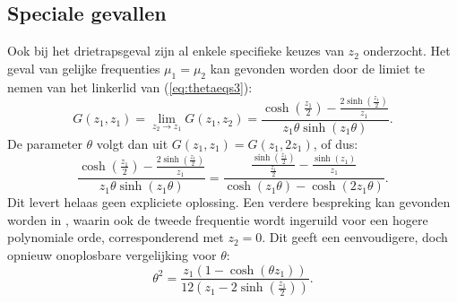 \documentclass[12pt]{article}
\begin{document}
\subsection{Speciale gevallen}
Ook bij het drietrapsgeval zijn al enkele specifieke keuzes van \(z_2\) onderzocht. Het geval van gelijke frequenties \(\mu_1=\mu_2\) kan gevonden worden door de limiet te nemen van het linkerlid van (\ref{eq:thetaeqs3}):
\[G(z_1,z_1)=\lim_{z_2\to z_1}G(z_1,z_2)=\frac{\cosh(\frac{z_1}{2})-\frac{2\sinh(\frac{z_1}{2})}{z_1}}{z_1\theta\sinh(z_1\theta)}.\]
De parameter \(\theta\) volgt dan uit \(G(z_1,z_1)=G(z_1,2z_1)\), of dus:
\begin{equation} \label{eq:rks3z2=z1}
    \frac{\cosh(\frac{z_1}{2})-\frac{2\sinh(\frac{z_1}{2})}{z_1}}{z_1\theta\sinh(z_1\theta)}=\frac{\frac{\sinh(\frac{z_1}{2})}{\frac{z_1}{2}}-\frac{\sinh(z_1)}{z_1}}{\cosh(z_1\theta)-\cosh(2z_1\theta)}.
\end{equation}
Dit levert helaas geen expliciete oplossing. Een verdere bespreking kan gevonden worden in \cite{EFRKrevisited}, waarin ook de tweede frequentie wordt ingeruild voor een hogere polynomiale orde, corresponderend met \(z_2=0\). Dit geeft een eenvoudigere, doch opnieuw onoplosbare vergelijking voor \(\theta\):
\begin{equation} \label{eq:rks3z2=0}
    \theta^2=\frac{z_1(1-\cosh(\theta z_1))}{12(z_1-2\sinh(\frac{z_1}{2}))}.
\end{equation}
\end{document}
